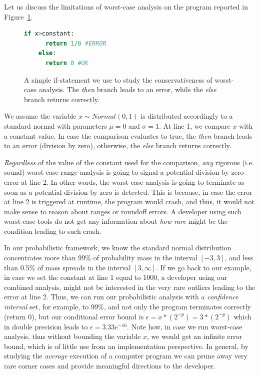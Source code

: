 %
Let us discuss the limitations of worst-case analysis on the program reported in Figure~\ref{fig:prob}.
%
\begin{figure}[tb!]
	\begin{lstlisting}[frame=single, language=Python]
	if x>constant:
	  return 1/0 #ERROR
	else:
	  return 0 #OK
	\end{lstlisting}
	\caption{A simple if-statement we use to study the conservativeness of worst-case analysis. The \emph{then} branch leads to an error, while the \emph{else} branch returns correctly.}
	\label{fig:prob}
\end{figure}
%
We assume the variable $x\sim Normal(0,1)$ is distributed accordingly to a standard normal with parameters $\mu = 0$ and $\sigma = 1$.
%
At line 1, we compare $x$ with a constant value.
%
In case the comparison evaluates to true, the \emph{then} branch leads to an error (division by zero), otherwise, the \emph{else} branch returns correctly.
%

\emph{Regardless} of the value of the constant used for the comparison, \emph{any} rigorous (i.e. sound) worst-case range analysis is going to signal a potential division-by-zero error at line 2.
%
In other words, the worst-case analysis is going to terminate as soon as a potential division by zero is detected.
%
This is because, in case the error at line 2 is triggered at runtime, the program would crash, and thus, it would not make sense to reason about ranges or roundoff errors.
%
A developer using such worst-case tools do not get any information about \emph{how rare} might be the condition leading to such crash.
%

In our probabilistic framework, we know the standard normal distribution concentrates more than 99\% of probability mass in the interval $[−3, 3]$, and less than 0.5\% of mass spreads in the interval $[3, \infty]$.
%
If we go back to our example, in case we set the constant at line 1 equal to 1000, a developer using our combined analysis, might not be interested in the very rare outliers leading to the error at line 2.
%
Thus, we can run our probabilistic analysis with a \emph{confidence interval} set, for example, to 99\%, and not only the program terminates correctly (return 0), but our conditional error bound is $\epsilon = x*(2^{-p}) = 3*(2^{-p})$ which in double precision leads to $\epsilon = 3.33e^{-16}$.
%
Note how, in case we run worst-case analysis, thus without bounding the variable $x$, we would get an infinite error bound, which is of little use from an implementation perspective. 
%
In general, by studying the \emph{average} execution of a computer program we can prune away very rare corner cases and provide meaningful directions to the developer.
%
\newpage



